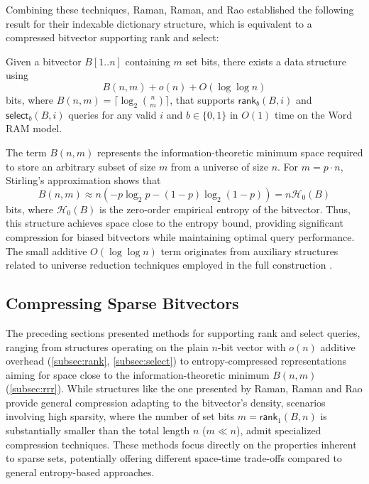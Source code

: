 Combining these techniques, Raman, Raman, and Rao established the following result for their indexable dictionary structure, which is equivalent to a compressed bitvector supporting rank and select:

\begin{theorem} \label{th:rrr}
    Given a bitvector $B[1..n]$ containing $m$ set bits, there exists a data structure using
    $$B(n, m) + o(n) + O(\log \log n)$$
    bits, where $B(n,m) = \lceil \log_2 \binom{n}{m} \rceil$, that supports $\textsf{rank}_b(B, i)$ and $\textsf{select}_b(B, i)$ queries for any valid $i$ and $b \in \{0,1\}$ in $O(1)$ time on the Word RAM model.
\end{theorem}

The term $B(n,m)$ represents the information-theoretic minimum space required to store an arbitrary subset of size $m$ from a universe of size $n$. For $m = p \cdot n$, Stirling's approximation shows that
$$B(n, m) \approx n(-p \log_2 p - (1-p) \log_2(1-p)) = n \mathcal{H}_0(B)$$
bits, where $\mathcal{H}_0(B)$ is the zero-order empirical entropy of the bitvector. Thus, this structure achieves space close to the entropy bound, providing significant compression for biased bitvectors while maintaining optimal query performance. The small additive $O(\log \log n)$ term originates from auxiliary structures related to universe reduction techniques employed in the full construction \cite{RRR2002}.

\subsection{Compressing Sparse Bitvectors} \label{subsec:elias_fano_compression}

The preceding sections presented methods for supporting \textsf{rank} and \textsf{select} queries, ranging from structures operating on the plain $n$-bit vector with $o(n)$ additive overhead (\ref{subsec:rank}, \ref{subsec:select}) to entropy-compressed representations aiming for space close to the information-theoretic minimum $B(n,m)$ (\ref{subsec:rrr}). While structures like the one presented by Raman, Raman and Rao \cite{RRR2002} provide general compression adapting to the bitvector's density, scenarios involving high sparsity, where the number of set bits $m = \textsf{rank}_1(B, n)$ is substantially smaller than the total length $n$ ($m \ll n$), admit specialized compression techniques. These methods focus directly on the properties inherent to sparse sets, potentially offering different space-time trade-offs compared to general entropy-based approaches.

